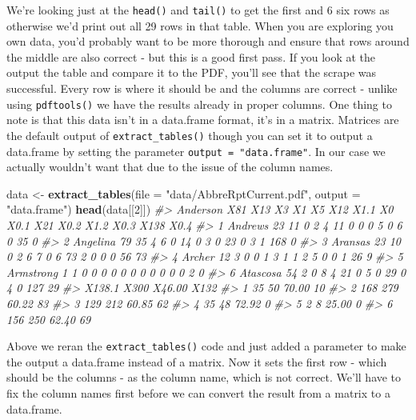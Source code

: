 \documentclass[
  12pt,
]{book}
\newenvironment{Shaded}{\begin{snugshade}}{\end{snugshade}}
\newcommand{\CommentTok}[1]{\textcolor[rgb]{0.37,0.37,0.37}{\textit{#1}}}
\newcommand{\DataTypeTok}[1]{\textcolor[rgb]{0.27,0.27,0.27}{#1}}
\newcommand{\DecValTok}[1]{\textcolor[rgb]{0.06,0.06,0.06}{#1}}
\newcommand{\KeywordTok}[1]{\textcolor[rgb]{0.27,0.27,0.27}{\textbf{#1}}}
\newcommand{\NormalTok}[1]{#1}
\newcommand{\StringTok}[1]{\textcolor[rgb]{0.5,0.5,0.5}{#1}}
\begin{document}
We're looking just at the \texttt{head()} and \texttt{tail()} to get the first and 6 six rows as otherwise we'd print out all 29 rows in that table. When you are exploring you own data, you'd probably want to be more thorough and ensure that rows around the middle are also correct - but this is a good first pass. If you look at the output the table and compare it to the PDF, you'll see that the scrape was successful. Every row is where it should be and the columns are correct - unlike using \texttt{pdftools()} we have the results already in proper columns. One thing to note is that this data isn't in a data.frame format, it's in a matrix. Matrices are the default output of \texttt{extract\_tables()} though you can set it to output a data.frame by setting the parameter \texttt{output\ =\ "data.frame"}. In our case we actually wouldn't want that due to the issue of the column names.

\begin{Shaded}
\begin{Highlighting}[]
\NormalTok{data <{-}}\StringTok{ }\KeywordTok{extract\_tables}\NormalTok{(}\DataTypeTok{file =} \StringTok{"data/AbbreRptCurrent.pdf"}\NormalTok{, }\DataTypeTok{output =} \StringTok{"data.frame"}\NormalTok{)}
\KeywordTok{head}\NormalTok{(data[[}\DecValTok{2}\NormalTok{]])}
\CommentTok{\#>    Anderson X81 X13 X3 X1 X5 X12 X1.1 X0 X0.1 X21 X0.2 X1.2 X0.3 X138 X0.4}
\CommentTok{\#> 1   Andrews  23  11  0  2  4  11    0  0    0   5    0    6    0   35    0}
\CommentTok{\#> 2  Angelina  79  35  4  6  0  14    0  3    0  23    0    3    1  168    0}
\CommentTok{\#> 3   Aransas  23  10  0  2  6   7    0  6   73   2    0    0    0   56   73}
\CommentTok{\#> 4    Archer  12   3  0  0  1   3    1  1    2   5    0    0    1   26    9}
\CommentTok{\#> 5 Armstrong   1   1  0  0  0   0    0  0    0   0    0    0    0    2    0}
\CommentTok{\#> 6  Atascosa  54   2  0  8  4  21    0  5    0  29    0    4    0  127   29}
\CommentTok{\#>   X138.1 X300 X46.00 X132}
\CommentTok{\#> 1     35   50  70.00   10}
\CommentTok{\#> 2    168  279  60.22   83}
\CommentTok{\#> 3    129  212  60.85   62}
\CommentTok{\#> 4     35   48  72.92    0}
\CommentTok{\#> 5      2    8  25.00    0}
\CommentTok{\#> 6    156  250  62.40   69}
\end{Highlighting}
\end{Shaded}

Above we reran the \texttt{extract\_tables()} code and just added a parameter to make the output a data.frame instead of a matrix. Now it sets the first row - which should be the columns - as the column name, which is not correct. We'll have to fix the column names first before we can convert the result from a matrix to a data.frame.
\end{document}
